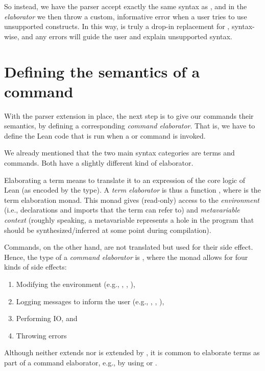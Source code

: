 So instead, we have the parser accept exactly the same syntax as \inductive{}, and in the \emph{elaborator} we then throw a custom, informative error when a user tries to use unsupported constructs.
In this way, \data{} is truly a drop-in replacement for \inductive{}, syntax-wise, and any errors will guide the user and explain unsupported syntax.



\section{Defining the semantics of a command}
With the parser extension in place, the next step is to give our commands their semantics, by defining a corresponding \emph{command elaborator}.
That is, we have to define the Lean code that is run when a \data{} or \codata{} command is invoked.

We already mentioned that the two main syntax categories are terms and commands.
Both have a slightly different kind of elaborator.

Elaborating a term means to translate it to an expression of the core logic of Lean (as encoded by the  type). A \emph{term elaborator} is thus a function , where  is the term elaboration monad. This monad gives (read-only) access to the \emph{environment} (i.e., declarations and imports that the term can refer to) and \emph{metavariable context} (roughly speaking, a metavariable represents a hole in the program that should be synthesized/inferred at some point during compilation).


Commands, on the other hand, are not translated but used for their side effect. Hence, the type of a \emph{command elaborator} is , where the  monad allows for four kinds of side effects: 
\begin{enumerate}
    \item Modifying the environment (e.g., \inductive{}, , ),
    \item Logging messages to inform the user (e.g., , , ),
    \item Performing IO, and
    \item Throwing errors
\end{enumerate}

Although  neither extends nor is extended by , it is common to elaborate terms as part of a command elaborator, e.g., by using  or .


